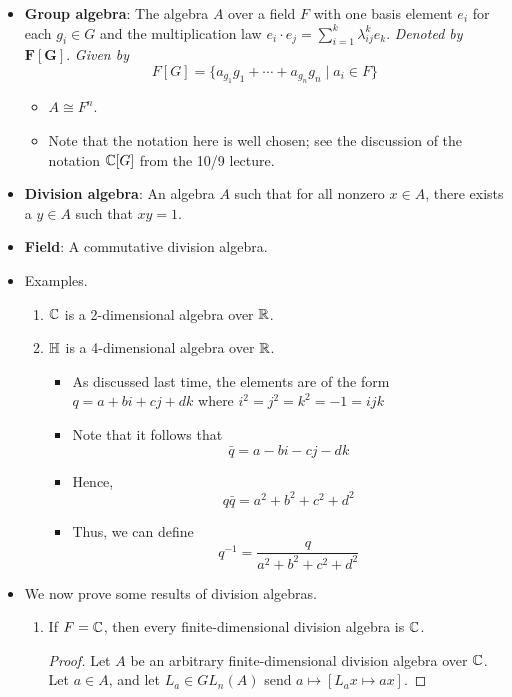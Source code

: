 \documentclass[../notes.tex]{subfiles}
\begin{document}
\begin{itemize}
\begin{proof}
        Understanding this??
    \end{proof}
    \item \textbf{Group algebra}: The algebra $A$ over a field $F$ with one basis element $e_i$ for each $g_i\in G$ and the multiplication law $e_i\cdot e_j=\sum_{i=1}^k\lambda_{ij}^ke_k$. \emph{Denoted by} $\bm{F[G]}$. \emph{Given by}
    \begin{equation*}
        F[G] = \{a_{g_1}g_1+\cdots+a_{g_n}g_n\mid a_i\in F\}
    \end{equation*}
    \begin{itemize}
        \item $A\cong F^n$.
        \item Note that the notation here is well chosen; see the discussion of the notation $\mathbb{C}[G]$ from the 10/9 lecture.
    \end{itemize}
    \item \textbf{Division algebra}: An algebra $A$ such that for all nonzero $x\in A$, there exists a $y\in A$ such that $xy=1$.
    \item \textbf{Field}: A commutative division algebra.
    \item Examples.
    \begin{enumerate}
        \item $\mathbb{C}$ is a 2-dimensional algebra over $\mathbb{R}$.
        \item $\mathbb{H}$ is a 4-dimensional algebra over $\mathbb{R}$.
        \begin{itemize}
            \item As discussed last time, the elements are of the form $q=a+bi+cj+dk$ where $i^2=j^2=k^2=-1=ijk$
            \item Note that it follows that
            \begin{equation*}
                \bar{q} = a-bi-cj-dk
            \end{equation*}
            \item Hence,
            \begin{equation*}
                q\bar{q} = a^2+b^2+c^2+d^2
            \end{equation*}
            \item Thus, we can define
            \begin{equation*}
                q^{-1} = \frac{q}{a^2+b^2+c^2+d^2}
            \end{equation*}
        \end{itemize}
    \end{enumerate}
    \item We now prove some results of division algebras.
    \begin{enumerate}
        \item If $F=\mathbb{C}$, then every finite-dimensional division algebra is $\mathbb{C}$.
        \begin{proof}
            Let $A$ be an arbitrary finite-dimensional division algebra over $\mathbb{C}$. Let $a\in A$, and let $L_a\in GL_n(A)$ send $a\mapsto[L_ax\mapsto ax]$.


\end{proof}
\end{enumerate}
\end{itemize}
\end{document}

